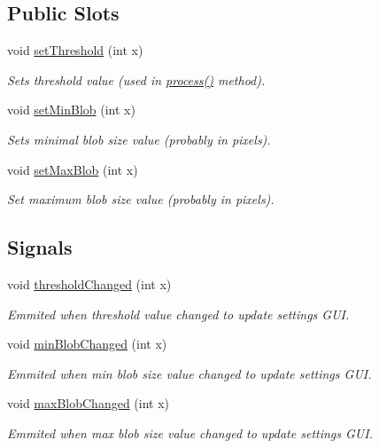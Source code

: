 \subsection*{Public Slots}
\begin{DoxyCompactItemize}
\item 
void \hyperlink{class_module_tracking_aab06b34268f721d21a4a227a0f98edf0}{setThreshold} (int x)
\begin{DoxyCompactList}\small\item\em Sets threshold value (used in \hyperlink{class_module_tracking_a2fbd4a21aafd845410393574ccc3ec23}{process()} method). \item\end{DoxyCompactList}\item 
void \hyperlink{class_module_tracking_a24125d19fd6bf57b05c41209d4656a75}{setMinBlob} (int x)
\begin{DoxyCompactList}\small\item\em Sets minimal blob size value (probably in pixels). \item\end{DoxyCompactList}\item 
void \hyperlink{class_module_tracking_a69f040985eaec331a5be5f6bed15fb5c}{setMaxBlob} (int x)
\begin{DoxyCompactList}\small\item\em Set maximum blob size value (probably in pixels). \item\end{DoxyCompactList}\end{DoxyCompactItemize}
\subsection*{Signals}
\begin{DoxyCompactItemize}
\item 
void \hyperlink{class_module_tracking_a1555f377f810048ac9b51081785dc433}{thresholdChanged} (int x)
\begin{DoxyCompactList}\small\item\em Emmited when threshold value changed to update settings GUI. \item\end{DoxyCompactList}\item 
void \hyperlink{class_module_tracking_aa54373d3ab5b494292667f208792688e}{minBlobChanged} (int x)
\begin{DoxyCompactList}\small\item\em Emmited when min blob size value changed to update settings GUI. \item\end{DoxyCompactList}\item 
void \hyperlink{class_module_tracking_a0c37f261a2679f5e10792c163c7ef9c3}{maxBlobChanged} (int x)
\begin{DoxyCompactList}\small\item\em Emmited when max blob size value changed to update settings GUI. \item\end{DoxyCompactList}\end{DoxyCompactItemize}
